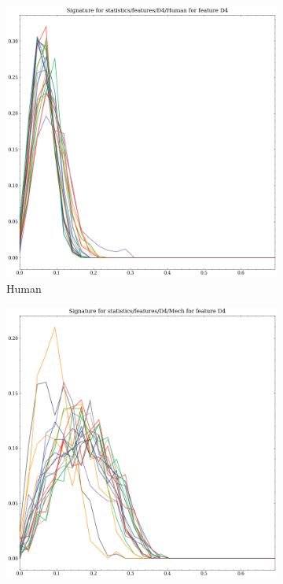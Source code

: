 \begin{figure}[t!p]
    \begin{subfigure}[b]{0.23\textwidth}
        \includegraphics[width=\textwidth]{assets/feature_extraction/D4/Human.png}
        \caption{Human}
    \end{subfigure}
    \hfill
    \begin{subfigure}[b]{0.23\textwidth}
        \includegraphics[width=\textwidth]{assets/feature_extraction/D4/Mech.png}

\end{subfigure}
\end{figure}

